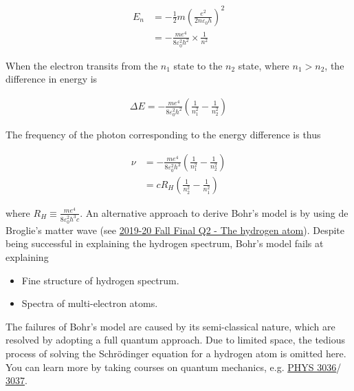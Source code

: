 \documentclass[12pt]{book} %
\numberwithin{equation}{chapter}
\def\D{\Delta}
\def\e{\varepsilon}
\begin{document}
\begin{eqnbox}
\begin{align}
E_{n}&=-\frac{1}{2}m{\left(\frac{e^{2}}{2n\e_{0}h}\right)}^{2}\nonumber\\
&=-\frac{me^{4}}{8\e_{0}^{2}h^{2}}\times \frac{1}{n^{2}}
\end{align}
\end{eqnbox}
When the electron transits from the $n_{1}$ state to the $n_{2}$ state, where $n_{1}>n_{2}$, the difference in energy is
\begin{eqnbox}
\begin{align}
\D E=-\frac{me^{4}}{8\e_{0}^{2}h^{2}}\left(\frac{1}{n_{1}^{2}}-\frac{1}{n_{2}^{2}}\right)
\end{align}
\end{eqnbox}
The frequency of the photon corresponding to the energy difference is thus
\begin{eqnbox}
\begin{align}
\nu&=-\frac{me^{4}}{8\e_{0}^{2}h^{3}}\left(\frac{1}{n_{1}^{2}}-\frac{1}{n_{2}^{2}}\right)\nonumber\\
&=cR_{H}\left(\frac{1}{n_{2}^{2}}-\frac{1}{n_{1}^{2}}\right)
\end{align}
\end{eqnbox}
where $R_{H}\equiv\frac{me^{4}}{8\e_{0}^{2}h^{3}c}$.\bigskip\newline
An alternative approach to derive Bohr's model is by using de Broglie's matter wave (see \hyperref[The hydrogen atom]{2019-20 Fall Final Q2 - The hydrogen atom}).\bigskip\newline
Despite being successful in explaining the hydrogen spectrum, Bohr's model fails at explaining
\begin{itembox}
\begin{itemize}
\item Fine structure of hydrogen spectrum.
\item Spectra of multi-electron atoms.
\end{itemize}
\end{itembox}
The failures of Bohr's model are caused by its semi-classical nature, which are resolved by adopting a full quantum approach. Due to limited space, the tedious process of solving the Schr\"{o}dinger equation for a hydrogen atom is omitted here. You can learn more by taking courses on quantum mechanics, e.g. \href{https://ust.space/review/PHYS3036}{PHYS 3036}/ \href{https://ust.space/review/PHYS3037}{3037}.
\end{document}
